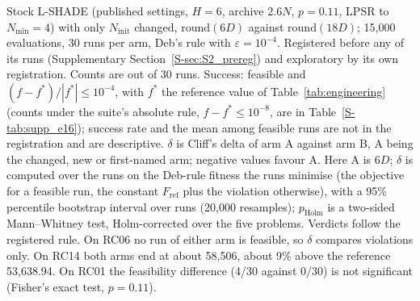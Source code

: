 \begin{table}[htbp]
\centering
\caption{The one-constant population control on the five design problems: L-SHADE with $N_{\text{init}}=6D$ against $18D$.}
\label{tab:e16}
\begin{flushleft}\footnotesize
Stock L-SHADE (published settings, $H=6$, archive $2.6N$, $p=0.11$, LPSR to $N_{\min}=4$) with only $N_{\text{init}}$ changed, $\mathrm{round}(6D)$ against $\mathrm{round}(18D)$; 15{,}000 evaluations, 30 runs per arm, Deb's rule with $\varepsilon=10^{-4}$. Registered before any of its runs (Supplementary Section~\ref{S-sec:S2_prereg}) and exploratory by its own registration. Counts are out of 30 runs. Success: feasible and $(f-f^{*})/|f^{*}|\le10^{-4}$, with $f^{*}$ the reference value of Table~\ref{tab:engineering} (counts under the suite's absolute rule, $f-f^{*}\le10^{-8}$, are in Table~\ref{S-tab:supp_e16}); success rate and the mean among feasible runs are not in the registration and are descriptive. $\delta$ is Cliff's delta of arm A against arm B, A being the changed, new or first-named arm; negative values favour A. Here A is $6D$; $\delta$ is computed over the runs on the Deb-rule fitness the runs minimise (the objective for a feasible run{,} the constant $F_{\text{ref}}$ plus the violation otherwise){,} with a 95\% percentile bootstrap interval over runs (20{{,}}000 resamples); $p_{\text{Holm}}$ is a two-sided Mann--Whitney test{,} Holm-corrected over the five problems. Verdicts follow the registered rule. On RC06 no run of either arm is feasible{,} so $\delta$ compares violations only. On RC14 both arms end at about 58{,}506, about 9\% above the reference 53{,}638.94. On RC01 the feasibility difference (4/30 against 0/30) is not significant (Fisher's exact test, $p=0.11$).
\end{flushleft}
\end{table}
